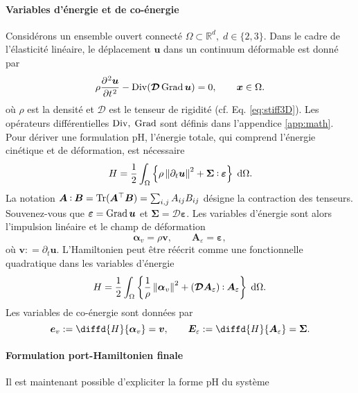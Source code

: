 \paragraph{Variables d'énergie et de co-énergie}
Considérons un ensemble ouvert connecté $\Omega \subset \mathbb{R}^d, \; d \in \{2,3 \} $. Dans le cadre de l'élasticité linéaire, le déplacement $\bm{u}$ dans un continuum déformable est donné par
\begin{equation*}
\rho \diffp[2]{\bm{u}}{t} - \Div(\bm{\mathcal{D}} \Grad \bm{u}) = 0, \qquad \bm{x} \in \Omega.
\end{equation*}
où $\rho$ est la densité et $\bm{\mathcal{D}}$ est le tenseur de rigidité (cf. Eq. \ref{eq:stiff3D}). Les opérateurs différentielles $\operatorname*{Div}, \; \operatorname*{Grad}$ sont définis dans l'appendice \ref{app:math}. Pour dériver une formulation pH, l'énergie totale, qui comprend l'énergie cinétique et de déformation, est nécessaire
\begin{equation*}
	H = \energy {\rho \norm{\partial_t \bm{u}}^2 + \bm{\Sigma} \cddot \bm{\varepsilon}}.
\end{equation*}
La notation $ \bm{A} \cddot \bm{B} = \Tr (\bm{A}^\top \bm{B}) = \sum_{i, j} A_{ij} B_{ij} $ désigne la contraction des tenseurs. Souvenez-vous que $\bm{\varepsilon} = \operatorname*{Grad} {\bm{u}} $ et $ \bm{\Sigma} = \bm{\mathcal{D}} \bm{\varepsilon}$. Les variables d'énergie sont alors l'impulsion linéaire et le champ de déformation
\begin{equation*}
\bm{\alpha}_v = \rho \bm{v}, \qquad \bm{A}_{\varepsilon} = \bm{\varepsilon},
\end{equation*}
où $ \bm{v}: = \partial_t \bm{u}$. L'Hamiltonien peut être réécrit comme une fonctionnelle quadratique dans les variables d'énergie
\begin{equation*}
H = \energy{\frac{1}{\rho} \norm{\bm{\alpha}_v}^2 + (\bm{\mathcal{D}} \bm{A}_{\varepsilon}) \cddot \bm{A}_{\varepsilon}}.
\end{equation*}
Les variables de co-énergie sont données par
\begin{equation*}
\bm{e}_v: = \diffd{H}{\bm{\alpha}_v} = \bm{v}, \qquad \bm{E}_\varepsilon: = \diffd{H}{\bm{A}_{\varepsilon}} = \bm{\Sigma}.
\end{equation*}

\paragraph{Formulation port-Hamiltonien finale}
Il est maintenant possible d'expliciter la forme pH du système

